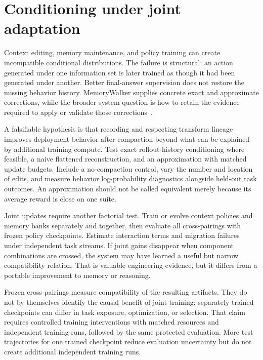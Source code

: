 \section{Conditioning under joint adaptation}\label{sec:C34:03}
Context editing, memory maintenance, and policy training can create incompatible conditional distributions. The failure is structural: an action generated under one information set is later trained as though it had been generated under another. Better final-answer supervision does not restore the missing behavior history. MemoryWalker supplies concrete exact and approximate corrections, while the broader system question is how to retain the evidence required to apply or validate those corrections~\cite{j2026memorywalker}.

A falsifiable hypothesis is that recording and respecting transform lineage improves deployment behavior after compaction beyond what can be explained by additional training compute. Test exact rollout-history conditioning where feasible, a naive flattened reconstruction, and an approximation with matched update budgets. Include a no-compaction control, vary the number and location of edits, and measure behavior log-probability diagnostics alongside held-out task outcomes. An approximation should not be called equivalent merely because its average reward is close on one suite.

Joint updates require another factorial test. Train or evolve context policies and memory banks separately and together, then evaluate all cross-pairings with frozen policy checkpoints. Estimate interaction terms and migration failures under independent task streams. If joint gains disappear when component combinations are crossed, the system may have learned a useful but narrow compatibility relation. That is valuable engineering evidence, but it differs from a portable improvement to memory or reasoning.

Frozen cross-pairings measure compatibility of the resulting artifacts. They do not by themselves identify the causal benefit of joint training: separately trained checkpoints can differ in task exposure, optimization, or selection. That claim requires controlled training interventions with matched resources and independent training runs, followed by the same protected evaluation. More test trajectories for one trained checkpoint reduce evaluation uncertainty but do not create additional independent training runs.

